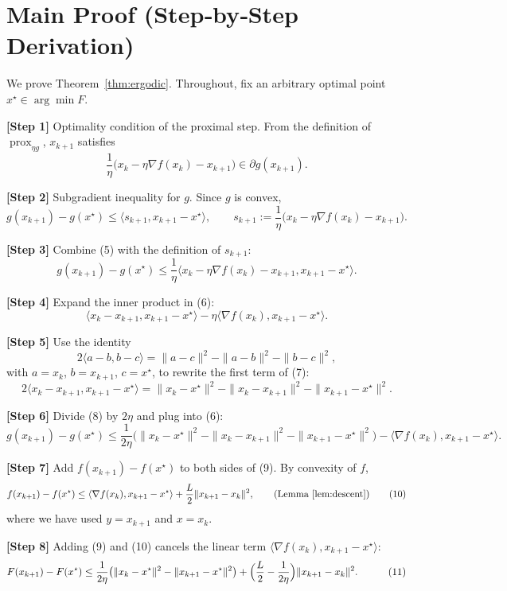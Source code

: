 \documentclass{article}
\newcommand{\prox}{\operatorname{prox}}
\newcommand{\grad}{\nabla}
\newcommand{\inner}[2]{\langle #1,#2\rangle}
\newcommand{\norm}[1]{\|#1\|}
\begin{document}
\section*{Main Proof (Step‑by‑Step Derivation)}
We prove Theorem~\ref{thm:ergodic}. Throughout, fix an arbitrary optimal point $x^{\star}\in\arg\min F$.

\noindent\textbf{[Step 1]}  Optimality condition of the proximal step.  
From the definition of $\prox_{\eta g}$, $x_{k+1}$ satisfies
\[
\frac{1}{\eta}\bigl(x_{k}-\eta\grad f(x_{k})-x_{k+1}\bigr)\in\partial g(x_{k+1}).
\tag{4}
\]

\noindent\textbf{[Step 2]}  Subgradient inequality for $g$.  
Since $g$ is convex,
\[
g(x_{k+1})-g(x^{\star})\le
\inner{s_{k+1}}{x_{k+1}-x^{\star}},\qquad
s_{k+1}:=\frac{1}{\eta}\bigl(x_{k}-\eta\grad f(x_{k})-x_{k+1}\bigr).
\tag{5}
\]

\noindent\textbf{[Step 3]}  Combine (5) with the definition of $s_{k+1}$:
\[
g(x_{k+1})-g(x^{\star})\le
\frac{1}{\eta}\inner{x_{k}-\eta\grad f(x_{k})-x_{k+1}}{x_{k+1}-x^{\star}}.
\tag{6}
\]

\noindent\textbf{[Step 4]}  Expand the inner product in (6):
\[
\inner{x_{k}-x_{k+1}}{x_{k+1}-x^{\star}}
-\eta\inner{\grad f(x_{k})}{x_{k+1}-x^{\star}}.
\tag{7}
\]

\noindent\textbf{[Step 5]}  Use the identity
\[
2\inner{a-b}{b-c}= \norm{a-c}^{2}-\norm{a-b}^{2}-\norm{b-c}^{2},
\]
with $a=x_{k}$, $b=x_{k+1}$, $c=x^{\star}$, to rewrite the first term of (7):
\[
2\inner{x_{k}-x_{k+1}}{x_{k+1}-x^{\star}}
= \norm{x_{k}-x^{\star}}^{2}-\norm{x_{k}-x_{k+1}}^{2}-\norm{x_{k+1}-x^{\star}}^{2}.
\tag{8}
\]

\noindent\textbf{[Step 6]}  Divide (8) by $2\eta$ and plug into (6):
\[
g(x_{k+1})-g(x^{\star})\le
\frac{1}{2\eta}\bigl(\norm{x_{k}-x^{\star}}^{2}
-\norm{x_{k}-x_{k+1}}^{2}
-\norm{x_{k+1}-x^{\star}}^{2}\bigr)
-\inner{\grad f(x_{k})}{x_{k+1}-x^{\star}}.
\tag{9}
\]

\noindent\textbf{[Step 7]}  Add $f(x_{k+1})-f(x^{\star})$ to both sides of (9).  
By convexity of $f$,
\[
f(x_{k+1})-f(x^{\star})\le
\inner{\grad f(x_{k})}{x_{k+1}-x^{\star}}
+\frac{L}{2}\norm{x_{k+1}-x_{k}}^{2},\qquad\text{(Lemma~\ref{lem:descent})}
\tag{10}
\]
where we have used $y=x_{k+1}$ and $x=x_{k}$.

\noindent\textbf{[Step 8]}  Adding (9) and (10) cancels the linear term
$\inner{\grad f(x_{k})}{x_{k+1}-x^{\star}}$:
\[
\begin{aligned}
F(x_{k+1})-F(x^{\star})
&\le
\frac{1}{2\eta}\bigl(\norm{x_{k}-x^{\star}}^{2}
-\norm{x_{k+1}-x^{\star}}^{2}\bigr)
+\Bigl(\frac{L}{2}-\frac{1}{2\eta}\Bigr)\norm{x_{k+1}-x_{k}}^{2}.
\end{aligned}
\tag{11}
\]
\end{document}
